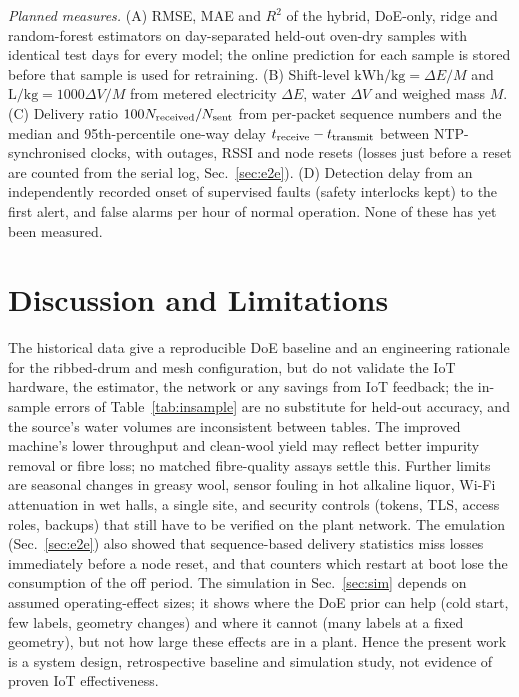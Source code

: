 \documentclass[journal]{IEEEtran}
\begin{document}
\emph{Planned measures.} (A) RMSE, MAE and $R^2$ of the hybrid, DoE-only, ridge and random-forest estimators on
day-separated held-out oven-dry samples with identical test days for every model; the online prediction for each
sample is stored before that sample is used for retraining. (B) Shift-level $\mathrm{kWh/kg}=\Delta E/M$ and
$\mathrm{L/kg}=1000\Delta V/M$ from metered electricity $\Delta E$, water $\Delta V$ and weighed mass $M$.
(C) Delivery ratio $100N_{\rm received}/N_{\rm sent}$ from per-packet sequence numbers and the median and
95th-percentile one-way delay $t_{\rm receive}-t_{\rm transmit}$ between NTP-synchronised clocks, with outages,
RSSI and node resets (losses just before a reset are counted from the serial log, Sec.~\ref{sec:e2e}). (D) Detection delay from an independently recorded onset of supervised faults (safety interlocks kept) to the
first alert, and false alarms per hour of normal operation. None of these has yet been measured.

\section{Discussion and Limitations}
The historical data give a reproducible DoE baseline and an engineering rationale for the ribbed-drum and mesh
configuration, but do not validate the IoT hardware, the estimator, the network or any savings from IoT feedback;
the in-sample errors of Table~\ref{tab:insample} are no substitute for held-out accuracy, and the source's water
volumes are inconsistent between tables. The improved machine's lower throughput and clean-wool yield may reflect
better impurity removal or fibre loss; no matched fibre-quality assays settle this. Further limits are seasonal
changes in greasy wool, sensor fouling in hot alkaline liquor, Wi-Fi attenuation in wet halls, a single site, and
security controls (tokens, TLS, access roles, backups) that still have to be verified on the plant network.
The emulation (Sec.~\ref{sec:e2e}) also showed that sequence-based delivery statistics miss losses immediately
before a node reset, and that counters which restart at boot lose the consumption of the off period.
The simulation in Sec.~\ref{sec:sim} depends on assumed operating-effect sizes; it
shows where the DoE prior can help (cold start, few labels, geometry changes) and where it
cannot (many labels at a fixed geometry), but not how large these effects are in a plant.
Hence the present work is a system design, retrospective baseline and simulation study,
not evidence of proven IoT effectiveness.
\end{document}
